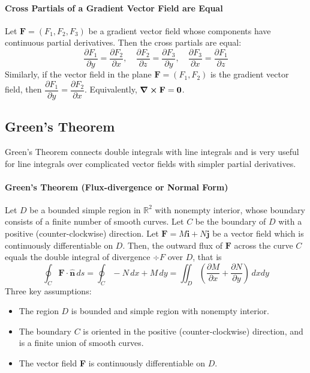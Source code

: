 \paragraph{Cross Partials of a Gradient Vector Field are Equal}
Let \(\textbf{F} = (F_1, F_2, F_3)\) be a gradient vector field whose components have continuous partial derivatives. Then the cross partials are equal:
\[\frac{\partial F_1}{\partial y} = \frac{\partial F_2}{\partial x}, \quad \frac{\partial F_2}{\partial z} = \frac{\partial F_3}{\partial y}, \quad \frac{\partial F_3}{\partial x} = \frac{\partial F_1}{\partial z}\]
Similarly, if the vector field in the plane \(\textbf{F} = (F_1, F_2)\) is the gradient vector field, then \(\dfrac{\partial F_1}{\partial y} = \dfrac{\partial F_2}{\partial x}\). Equivalently, \(\curl \textbf{F} = \textbf{0}\).

\subsection{Green's Theorem}
Green's Theorem connects double integrals with line integrals and is very useful for line integrals over complicated vector fields with simpler partial derivatives. 

\paragraph{Green's Theorem (Flux-divergence or Normal Form)}
Let \(D\) be a bounded simple region in \(\mathbb R^2\) with nonempty interior, whose boundary consists of a finite number of smooth curves. Let \(C\) be the boundary of \(D\) with a positive (counter-clockwise) direction. Let \(\textbf{F} = M\textbf{i} + N\textbf{j}\) be a vector field which is continuously differentiable on \(D\).  Then, the outward flux of \(\textbf{F}\) across the curve \(C\) equals the double integral of divergence \(\div F\) over \(D\), that is
\[\oint_C \textbf{F} \cdot \hat{\textbf{n}} \, ds = \oint_C - N \, dx + M \, dy = \iint_D \left(\frac{\partial M}{\partial x} + \frac{\partial N}{\partial y} \right) \, dxdy\]
Three key assumptions:
\begin{itemize}
    \item The region \(D\) is bounded and simple region with nonempty interior.
    \item The boundary \(C\) is oriented in the positive (counter-clockwise) direction, and is a finite union of smooth curves.
    \item The vector field \textbf{F} is continuously differentiable on \(D\).
\end{itemize}

